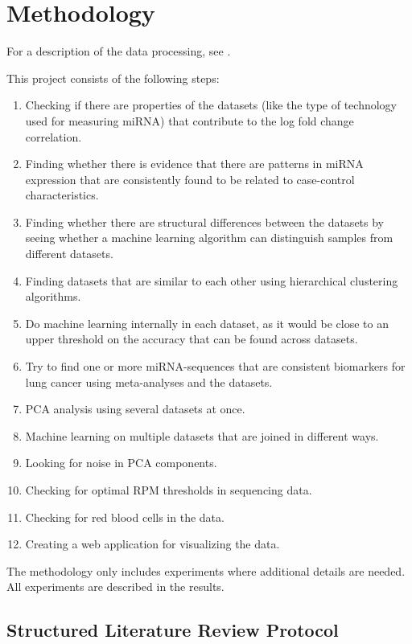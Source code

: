 \chapter{Methodology}
\label{cha:Methodology}

For a description of the data processing, see \citet{forprosjekt}.

This project consists of the following steps:
\begin{enumerate}
    \item Checking if there are properties of the datasets (like the type of technology used for measuring miRNA) that contribute to the log fold change correlation.
    \item Finding whether there is evidence that there are patterns in miRNA expression that are consistently found to be related to case-control characteristics.
    \item Finding whether there are structural differences between the datasets by seeing whether a machine learning algorithm can distinguish samples from different datasets.
    \item Finding datasets that are similar to each other using hierarchical clustering algorithms.
    \item Do machine learning internally in each dataset, as it would be close to an upper threshold on the accuracy that can be found across datasets.
    \item Try to find one or more miRNA-sequences that are consistent biomarkers for lung cancer using meta-analyses and the datasets.
    \item PCA analysis using several datasets at once.
    \item Machine learning on multiple datasets that are joined in different ways.
    \item Looking for noise in PCA components.
    \item Checking for optimal RPM thresholds in sequencing data.
    \item Checking for red blood cells in the data.
    \item Creating a web application for visualizing the data.
\end{enumerate}

The methodology only includes experiments where additional details are needed. All experiments are described in the results.

\section{Structured Literature Review Protocol}
\label{sec:literature_review}

